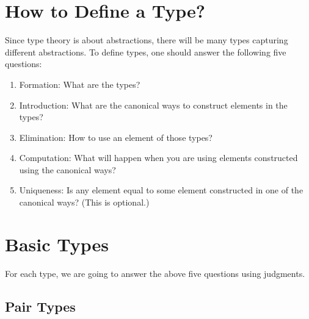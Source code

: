 \documentclass[11pt]{article}
\begin{document}
\section{How to Define a Type?}

Since type theory is about abstractions, there will be many types capturing different abstractions. To define types, one should answer the following five questions:

\begin{enumerate}
  \item Formation: What are the types?
  \item Introduction: What are the canonical ways to construct elements in the types?
  \item Elimination: How to use an element of those types?
  \item Computation: What will happen when you are using elements constructed using the canonical ways?
  \item Uniqueness: Is any element equal to some element constructed in one of the canonical ways?
    (This is optional.)
\end{enumerate}

\section{Basic Types}

For each type, we are going to answer the above five questions using judgments.

\subsection{Pair Types}
\end{document}

